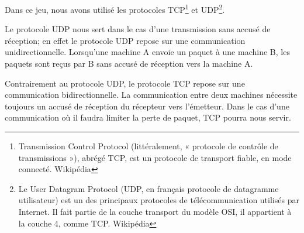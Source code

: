\par
Dans ce jeu, nous avons utilisé les protocoles TCP\footnote{Transmission Control Protocol (littéralement, « protocole de contrôle de transmissions »), abrégé TCP, est un protocole de transport fiable, en mode connecté. Wikipédia} et UDP\footnote{Le User Datagram Protocol (UDP, en français protocole de datagramme utilisateur) est un des principaux protocoles de télécommunication utilisés par Internet. Il fait partie de la couche transport du modèle OSI, il appartient à la couche 4, comme TCP. Wikipédia}.

\par
Le protocole UDP nous sert dans le cas d'une transmission sans accusé de réception; en effet le protocole UDP repose sur une communication unidirectionnelle. Lorsqu'une machine A envoie un paquet à une machine B, les paquets sont reçus par B sans accusé de réception vers la machine A.

\par
Contrairement au protocole UDP, le protocole TCP repose sur une communication bidirectionnelle. La communication entre deux machines nécessite toujours un accusé de réception du récepteur vers l'émetteur. Dans le cas d'une communication où il faudra limiter la perte de paquet, TCP pourra nous servir.